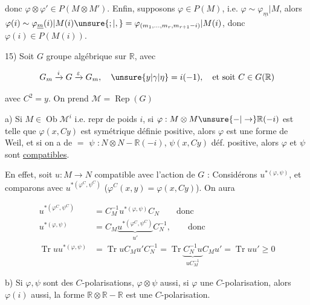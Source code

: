 
donc $\varphi\otimes\varphi'\in P(M\otimes M')$. Enfin, supposons $\varphi\in P(M)$, i.e. $\varphi\sim\varphi_{\underline m}|M$, alors $\varphi(i)\sim\varphi_{\underline m}(i)|M(i)\unsure{;|,}=\varphi_{(m_1,\ldots,m_r,m_{r+1}-i)}|M(i)$, donc $\varphi(i)\in P(M(i))$.

15) Soit $G$ groupe algébrique sur $\mathbb R$,  avec

\[
G_m\xrightarrow{i}G\xrightarrow{\varepsilon}G_m,\quad\unsure{y|\gamma|\eta}=i(-1),\quad\text{et soit }C\in G(\mathbb R)
\]

avec $C^2=y$. On prend $\mathcal M=\operatorname{Rep}(G)$

 a) Si $M\in\operatorname{Ob}\mathcal M^i$ i.e.  repr de  poids $i$,  si $\varphi:M\otimes M\unsure{-|\to}\mathbb R(-i)$ est telle que $\varphi(x,Cy)$ est symétrique définie positive, alors $\varphi$ est une forme de Weil, et si on a de $=$ $\psi$ \deleted{\unsure{$\longmapsto$}} $:N\otimes N-\mathbb R(-i)$, $\psi(x,Cy)$ déf. positive, alors $\varphi$ et $\psi$ sont \uline{compatibles}.



En effet, soit $u:M\longrightarrow N$ compatible avec l'action de $G$ : Considérons $u^{*(\varphi,\psi)}$, et comparons avec $u^{*(\varphi^C,\psi^C)}$ ($\varphi^C(x,y)=\varphi(x,Cy)$). On aura

\[
\begin{aligned}
u^{*(\varphi^C,\psi^C)}&=C_M^{-1}u^{*(\varphi,\psi)}C_N\qquad\text{donc}\\
u^{*(\varphi,\psi)}&=C_M\underbrace{u^{*(\varphi^C,\psi^C)}}_{u'}C_N^{-1},\qquad\text{donc}\\
\operatorname{Tr}uu^{*(\varphi,\psi)}&=\operatorname{Tr}uC_Mu'C_N^{-1}
=\operatorname{Tr}\underbrace{C_N^{-1}u}_{uC_M^{-1}}C_Mu'=\operatorname{Tr}uu'\geq0
\end{aligned}
\]



b) Si $\varphi,\psi$ sont des $C$-polarisations, $\varphi\otimes\psi$ aussi, si $\varphi$ une $C$-polarisation, alors $\varphi(i)$ aussi,  la forme  $\mathbb R\otimes\mathbb R-\mathbb R$ est une $C$-polarisation.

